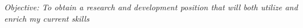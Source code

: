 \documentclass{res}
\begin{document}
 
\thispagestyle{empty} %
\address{
{\tt \small hyogi@vt.edu}, (540) 391-0202 \\
Dept. of Computer Science, Virginia Tech\\
2202 Kraft Drive, Blacksburg, VA 24060\\
}

\begin{resume}
{\small \it Objective: To obtain a research and development position 
that will both utilize and enrich my current skills}

 
 
 






 
\end{resume}
\end{document}
